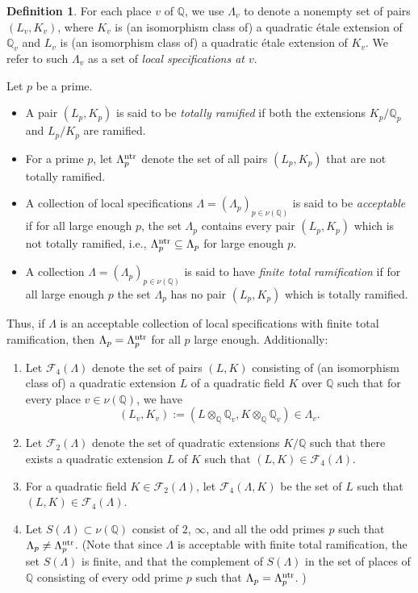 \documentclass[10pt]{article}
\theoremstyle{plain}
\theoremstyle{definition}
\newtheorem{defn}[thm]{Definition}
\theoremstyle{remark}
\def\Val{{\nu}}
\def\FF{{\mathcal F}}
\def\Q{{\mathbb Q}}
\def\Q{{\mathbb Q}}
\def\bQ{{\mathbb Q}}
\def\cF{{\mathcal F}}
\def\bQ{{\mathbb Q}}
\begin{document}
\begin{defn}\label{localspec}
For each place $v$ of $\Q$, we use $\Lambda_v$ to denote a nonempty set of pairs
$(L_v,K_v)$, where $K_v$ is (an isomorphism class of) a quadratic \'etale extension of $\Q_v$
and $L_v$ is (an isomorphism class of) a quadratic \'etale extension of $K_v$. We refer to such $\Lambda_v$ as a set of {\em local specifications at $v$}. 

Let $p$ be a prime. 
\begin{itemize}
    \item A pair $(L_p,K_p)$ is said to be {\it totally ramified} if both the
extensions $K_p/\Q_p$ and $L_p/K_p$ are ramified.
    \item For a prime $p$, let $\Lambda_p^{\rm ntr}$ denote the set of all pairs $(L_p,K_p)$ that are not totally ramified.
    \item A collection of local specifications
$\Lambda=(\Lambda_p)_{p \in \nu(\bQ)}$ is said to be {\it acceptable} if for all
large enough $p$, the set $\Lambda_p$ contains every pair
$(L_p,K_p)$ which is not totally ramified, i.e., $\Lambda_p^{\rm ntr} \subseteq \Lambda_p$ for large enough $p$. 
    \item  A collection $\Lambda = (\Lambda_p)_{p \in \nu(\bQ)}$ is
said to have {\it finite total ramification} if for all large enough
$p$ the set $\Lambda_p$ has no pair $(L_p,K_p)$ which is totally
ramified.
\end{itemize}
Thus, if $\Lambda$ is an acceptable collection of local specifications with finite total ramification, then $\Lambda_p = \Lambda_p^{\rm ntr}$  for all $p$ large enough. Additionally: 
\begin{enumerate}
\item[\rm(a)]  Let $\cF_4(\Lambda)$ denote the set of pairs $(L, K)$
  consisting of (an isomorphism class of) a quadratic extension $L$ of
  a quadratic field $K$ over $\Q$ such that for every place $v \in \nu(\Q)$, we have
  $$(L_v,K_v):=(L \otimes_{\bQ} \bQ_v, K\otimes_{\bQ} \bQ_v) \in
  \Lambda_v.$$
\item[{\rm (b)}] Let $\FF_2(\Lambda)$ denote the set of quadratic
  extensions $K/\bQ$ such that there exists a quadratic extension $L$
  of $K$ such that $(L,K) \in \cF_4(\Lambda)$.
\item[{\rm (c)}] For a quadratic field $K \in \FF_2(\Lambda)$, let $\FF_4(\Lambda,K)$ be
  the set of $L$ such that $(L,K)\in\FF_4(\Lambda)$.
  \item[{\rm (d)}]   Let $S(\Lambda)\subset\Val(\bQ)$ 
consist of $2$, $\infty$, and all the odd primes $p$ such that
$\Lambda_p \neq \Lambda_p^{\rm ntr}$. (Note that since $\Lambda$ is acceptable with finite total
ramification, the set $S(\Lambda)$ is finite, and that the complement of $S(\Lambda)$ in the set of places of $\Q$ consisting of every odd prime $p$ such that $\Lambda_p = \Lambda_p^{\rm ntr}$. ) 


\end{enumerate}
\end{defn}
\end{document}
